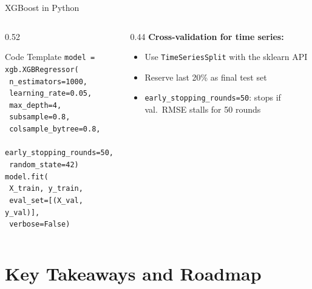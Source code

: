 \documentclass[aspectratio=169, 11pt]{beamer}
\begin{document}
\begin{frame}{XGBoost in Python}
  \begin{columns}[T]
    \begin{column}{0.52\textwidth}
      \begin{examplebox}{Code Template}
        {\scriptsize
        \texttt{model = xgb.XGBRegressor(}\\
        \texttt{  n\_estimators=1000,}\\
        \texttt{  learning\_rate=0.05,}\\
        \texttt{  max\_depth=4,}\\
        \texttt{  subsample=0.8,}\\
        \texttt{  colsample\_bytree=0.8,}\\
        \texttt{  early\_stopping\_rounds=50,}\\
        \texttt{  random\_state=42)}\\
        \texttt{model.fit(}\\
        \texttt{  X\_train, y\_train,}\\
        \texttt{  eval\_set=[(X\_val, y\_val)],}\\
        \texttt{  verbose=False)}
        }
      \end{examplebox}
    \end{column}
    \begin{column}{0.44\textwidth}
      \textbf{Cross-validation for time series:}
      \begin{itemize}\footnotesize\itemsep0pt
        \item Use \texttt{TimeSeriesSplit} with the sklearn API
        \item Reserve last 20\% as final test set
        \item \texttt{early\_stopping\_rounds=50}: stops if val.\ RMSE stalls for 50 rounds
      \end{itemize}
    \end{column}
  \end{columns}
\end{frame}

\section{Key Takeaways and Roadmap}
\end{document}

